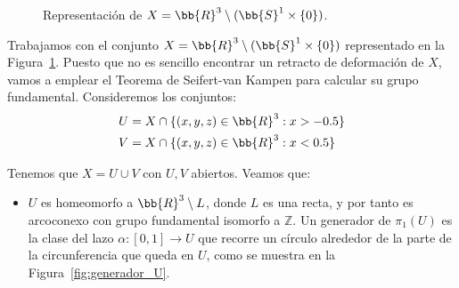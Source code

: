 \documentclass[12pt]{article}
\begin{document}
\begin{ejercicio}
\begin{figure}[ht]
\begin{tikzpicture}[tdplot_main_coords, scale=2]
            \end{tikzpicture}
            \caption{Representación de $X=\bb{R}^3\setminus (\bb{S}^1\times \{0\})$.}
            \label{fig:conjuntoX}
        \end{figure}
        Trabajamos con el conjunto $X = \bb{R}^3\setminus (\bb{S}^1\times \{0\})$ representado en la Figura~\ref{fig:conjuntoX}. Puesto que no es sencillo encontrar un retracto de deformación de $X$, vamos a emplear el Teorema de Seifert-van Kampen para calcular su grupo fundamental. Consideremos los conjuntos:
        \begin{align*}
            U &= X\cap \{(x,y,z)\in \bb{R}^3 : x > -0.5\} \\
            V &= X\cap \{(x,y,z)\in \bb{R}^3 : x < 0.5\}
        \end{align*}

        Tenemos que $X = U\cup V$ con $U,V$ abiertos. Veamos que:
        \begin{itemize}
            \item $U$ es homeomorfo a $\bb{R}^3\setminus L$, donde $L$ es una recta, y por tanto es arcoconexo con grupo fundamental isomorfo a $\mathbb{Z}$. Un generador de $\pi_1(U)$ es la clase del lazo $\alpha:[0,1]\to U$ que recorre un círculo alrededor de la parte de la circunferencia que queda en $U$, como se muestra en la Figura~\ref{fig:generador_U}.
            \begin{figure}[ht]
                \centering
\end{figure}
\end{itemize}
\end{ejercicio}
\end{document}
